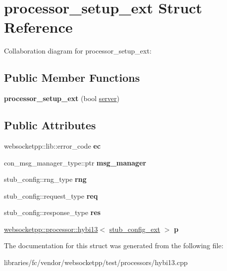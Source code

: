\hypertarget{structprocessor__setup__ext}{}\section{processor\+\_\+setup\+\_\+ext Struct Reference}
\label{structprocessor__setup__ext}


Collaboration diagram for processor\+\_\+setup\+\_\+ext\+:
\subsection*{Public Member Functions}
\begin{DoxyCompactItemize}
\item 
\mbox{\label{structprocessor__setup__ext_a7be679fcc1767117e9040bce609e59ab}} 
{\bfseries processor\+\_\+setup\+\_\+ext} (bool \mbox{\hyperlink{classwebsocketpp_1_1server}{server}})
\end{DoxyCompactItemize}
\subsection*{Public Attributes}
\begin{DoxyCompactItemize}
\item 
\mbox{\label{structprocessor__setup__ext_a500a49844ae879bb8189a58e89005cfa}} 
websocketpp\+::lib\+::error\+\_\+code {\bfseries ec}
\item 
\mbox{\label{structprocessor__setup__ext_a28f7642ffd000c87b1f6e1636fa89858}} 
con\+\_\+msg\+\_\+manager\+\_\+type\+::ptr {\bfseries msg\+\_\+manager}
\item 
\mbox{\label{structprocessor__setup__ext_a320e92e2721ed24ee02f04c103b78428}} 
stub\+\_\+config\+::rng\+\_\+type {\bfseries rng}
\item 
\mbox{\label{structprocessor__setup__ext_a3407743ef41e1a27cf5da82d467777d0}} 
stub\+\_\+config\+::request\+\_\+type {\bfseries req}
\item 
\mbox{\label{structprocessor__setup__ext_a92adbb5666a2e60851507757f1f36443}} 
stub\+\_\+config\+::response\+\_\+type {\bfseries res}
\item 
\mbox{\label{structprocessor__setup__ext_a04ff04a58e537a96fc110d36928f828b}} 
\mbox{\hyperlink{classwebsocketpp_1_1processor_1_1hybi13}{websocketpp\+::processor\+::hybi13}}$<$ \mbox{\hyperlink{structstub__config__ext}{stub\+\_\+config\+\_\+ext}} $>$ {\bfseries p}
\end{DoxyCompactItemize}


The documentation for this struct was generated from the following file\+:\begin{DoxyCompactItemize}
\item 
libraries/fc/vendor/websocketpp/test/processors/hybi13.\+cpp\end{DoxyCompactItemize}

